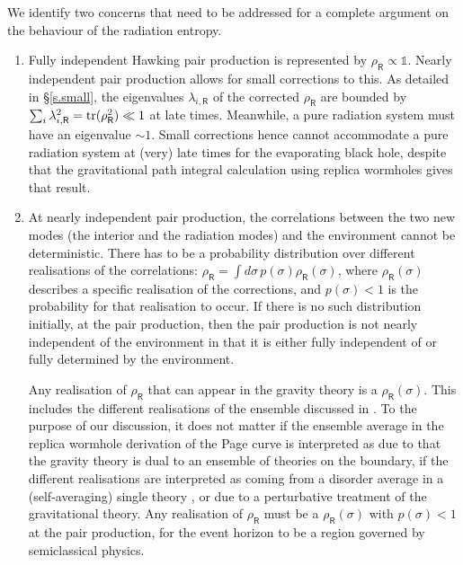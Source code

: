 \documentclass[12pt]{article}
\numberwithin{equation}{section}
\begin{document}
We identify two concerns that need to be addressed for a complete argument on the behaviour of the radiation entropy.
\begin{enumerate}
\item Fully independent Hawking pair production is represented by $\rho_\textsf{R}\propto \mathbb{1}$. Nearly independent pair production allows for small corrections to this. As detailed in \S\ref{s.small}, the eigenvalues $\lambda_{i,\textsf{R}}$ of the corrected $\rho_\textsf{R}$ are bounded by $\sum_i \lambda_{i,\textsf{R}}^2={\rm tr}(\rho_\textsf{R}^2)\ll1$ at late times. Meanwhile, a pure radiation system must have an eigenvalue $\sim 1$. Small corrections hence cannot accommodate a pure radiation system at (very) late times for the evaporating black hole, despite that the gravitational path integral calculation using replica wormholes gives that result.
\item At nearly independent pair production, the correlations between the two new modes (the interior and the radiation modes) and the environment cannot be deterministic. There has to be a probability distribution over different realisations of the correlations: $\rho_\textsf{R}=\int d\sigma \,p(\sigma)\rho_\textsf{R}(\sigma)$, where $\rho_\textsf{R}(\sigma)$ describes a specific realisation of the corrections, and $p(\sigma)<1$ is the probability for that realisation to occur. If there is no such distribution initially, at the pair production, then the pair production is not nearly independent of the environment in that it is either fully independent of or fully determined by the environment.

Any realisation of $\rho_\textsf{R}$ that can appear in the gravity theory is a $\rho_\textsf{R}(\sigma)$. This includes the different realisations of the ensemble discussed in \cite{Penington:2019kki}. To the purpose of our discussion, it does not matter if the ensemble average in the replica wormhole derivation of the Page curve is interpreted as due to that the gravity theory is dual to an ensemble of theories on the boundary, if the different realisations are interpreted as coming from a disorder average in a (self-averaging) single theory \cite{Pollack:2020gfa}, or due to a perturbative treatment of the gravitational theory. Any realisation of $\rho_\textsf{R}$ must be a $\rho_\textsf{R}(\sigma)$ with $p(\sigma)<1$ at the pair production, for the event horizon to be a region governed by semiclassical physics.


\end{enumerate}
\end{document}
